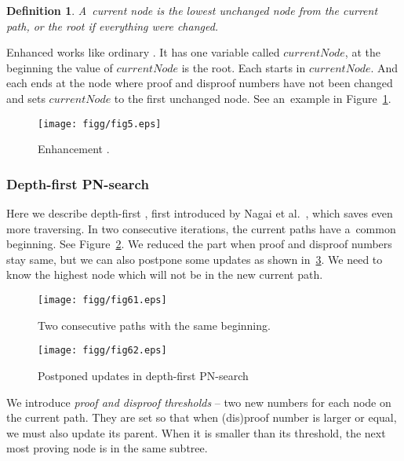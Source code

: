 \newtheorem*{currentNode}{Definition}	
\begin{currentNode}
A~{\sl current node} is the lowest unchanged node from the current path, or
the root if everything were changed.
\end{currentNode}

Enhanced  works like ordinary . It has one variable
called $currentNode$, at the beginning the value of $currentNode$ is the root. Each
 starts in $currentNode$. And each 
ends at the node where proof and disproof numbers have not been changed and sets 
$currentNode$ to the first unchanged node. See an~example in Figure~\ref{sest}.

\begin{figure}
	\centerline{\mbox{\texttt{[image: figg/fig5.eps]}}}
	\caption{Enhancement .}
	\label{sest}
\end{figure}

\subsubsection{Depth-first PN-search} \label{dfpn}

Here we describe depth-first , first introduced by Nagai et al.~\cite{nagai},
which saves even more traversing. In two consecutive iterations, the current
paths have a~common beginning. See Figure~\ref{sestjedna}. We reduced the part when
proof and disproof numbers stay same, but we can also postpone some updates as
shown in~\ref{sestdva}. We need to know the highest node which will not be in the
new current path. 

\begin{figure}
	\centerline{\mbox{\texttt{[image: figg/fig61.eps]}}}
	\caption{Two consecutive paths with the same beginning.}
	\label{sestjedna}
\end{figure}

\begin{figure}
	\centerline{\mbox{\texttt{[image: figg/fig62.eps]}}}
	\caption{Postponed updates in depth-first PN-search}
	\label{sestdva}
\end{figure}

We introduce \emph{proof and disproof thresholds} -- two new numbers for each node on
the current path. They are set so that when (dis)proof number is larger or
equal, we must also update its parent. When it is smaller than its threshold,
the next most proving node is in the same subtree. 

